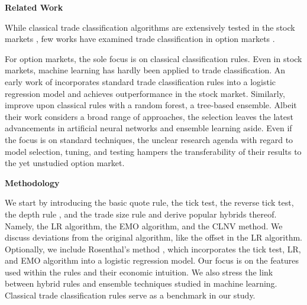 \textbf{Related Work}

While classical trade classification algorithms are extensively tested in the stock markets \autocites[e.~g.,][]{chakrabartyTradeClassificationAlgorithms2012}{odders-whiteOccurrenceConsequencesInaccurate2000}, few works have examined trade classification in option markets \autocites{grauerOptionTradeClassification2022}{savickasInferringDirectionOption2003}.

For option markets, the sole focus is on classical classification rules. Even in stock markets, machine learning has hardly been applied to trade classification. An early work of \textcite{rosenthalModelingTradeDirection2012} incorporates standard trade classification rules into a logistic regression model and achieves outperformance in the stock market. Similarly, \textcites{fedeniaMachineLearningCorporate2021}{ronenMachineLearningTrade2022} improve upon classical rules with a random forest, a tree-based ensemble. Albeit their work considers a broad range of approaches, the selection leaves the latest advancements in artificial neural networks and ensemble learning aside. Even if the focus is on standard techniques, the unclear research agenda with regard to model selection, tuning, and testing hampers the transferability of their results to the yet unstudied option market. 

\textbf{Methodology}

We start by introducing the basic quote rule, the tick test, the reverse tick test, the depth rule \autocite{grauerOptionTradeClassification2022}, and the trade size rule \autocite{grauerOptionTradeClassification2022} and derive popular hybrids thereof. Namely, the \gls{LR} algorithm, the \gls{EMO} algorithm, and the  \gls{CLNV} method. We discuss deviations from the original algorithm, like the offset in the \gls{LR} algorithm. Optionally, we include Rosenthal's method \autocite{rosenthalModelingTradeDirection2012}, which incorporates the tick test, \gls{LR}, and \gls{EMO} algorithm into a logistic regression model. Our focus is on the features used within the rules and their economic intuition. We also stress the link between hybrid rules and ensemble techniques studied in machine learning. Classical trade classification rules serve as a benchmark in our study.

